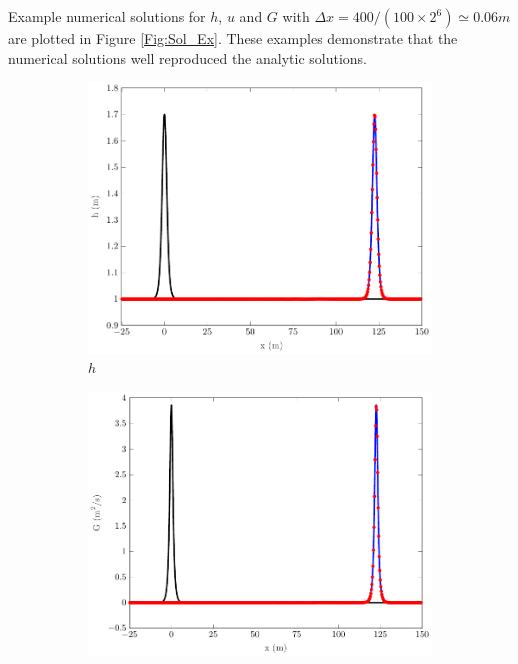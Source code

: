 \documentclass[10pt]{elsarticle}
\begin{document}
Example numerical solutions for $h$, $u$ and $G$ with $\Delta x = 400 / (100 \times 2^{6}) \simeq 0.06m$ are plotted in Figure \ref{Fig:Sol_Ex}. These examples demonstrate that the numerical solutions well reproduced the analytic solutions.
%
\begin{figure}
	\centering
	\begin{subfigure}{0.32\textwidth}
		\centering
		\includegraphics[width=\textwidth]{./Figures/Simulations/Validation/Serre/h.pdf}
		\caption{$h$}
	\end{subfigure}
	\begin{subfigure}{0.32\textwidth}
		\centering
		\includegraphics[width=\textwidth]{./Figures/Simulations/Validation/Serre/G.pdf}

\end{subfigure}
\end{figure}
\end{document}
